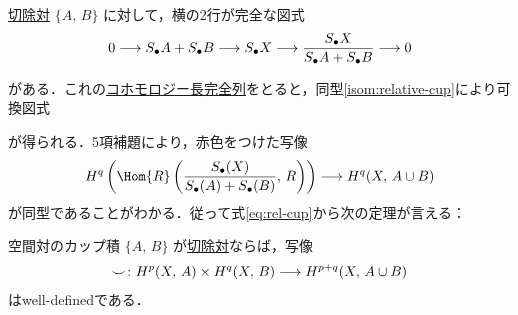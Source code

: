 \documentclass[algtopo_main]{subfiles}
\begin{document}
\hyperref[def:exc-pair]{切除対} $\{A,\, B\}$ に対して，横の2行が完全な図式
\begin{align}
    0 \longrightarrow S_\bullet A + S_\bullet B \longrightarrow  S_\bullet X \longrightarrow \frac{S_\bullet X}{S_\bullet A + S_\bullet B} \longrightarrow 0
\end{align}
\begin{center}
\end{center}
がある．これの\hyperref[prop:LES-cohomology]{コホモロジー長完全列}をとると，同型\eqref{isom:relative-cup}により可換図式

\begin{figure}[H]
    \centering
\end{figure}%

が得られる．5項補題により，赤色をつけた写像
\begin{align}
    H^q \left(\Hom{R}\left(\frac{S_\bullet(X)}{S_\bullet (A) + S_\bullet (B)},\, R\right)\right) \lto H^q (X,\, A \cup B) 
\end{align}
が同型であることがわかる．従って式\eqref{eq:rel-cup}から次の定理が言える：

\begin{mytheo}[label=thm:relative-cup]{空間対のカップ積}
    $\{A,\, B\}$ が\hyperref[def:exc-pair]{切除対}ならば，写像
    \begin{align}
        \smile \colon H^p(X,\, A) \times H^q(X,\, B) \longrightarrow H^{p+q} (X,\, A\cup B)
    \end{align}
    はwell-definedである．
\end{mytheo}
\end{document}
